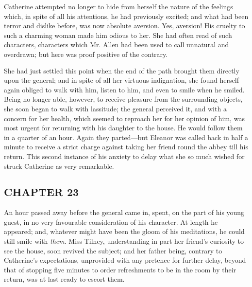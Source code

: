 Catherine attempted no longer to hide from herself the nature of the feelings which, in spite of all his attentions, he had previously excited; and what had been terror and dislike before, was now absolute aversion. Yes, aversion! His cruelty to such a charming woman made him odious to her. She had often read of such characters, characters which Mr. Allen had been used to call unnatural and overdrawn; but here was proof positive of the contrary.

She had just settled this point when the end of the path brought them directly upon the general; and in spite of all her virtuous indignation, she found herself again obliged to walk with him, listen to him, and even to smile when he smiled. Being no longer able, however, to receive pleasure from the surrounding objects, she soon began to walk with lassitude; the general perceived it, and with a concern for her health, which seemed to reproach her for her opinion of him, was most urgent for returning with his daughter to the house. He would follow them in a quarter of an hour. Again they parted---but Eleanor was called back in half a minute to receive a strict charge against taking her friend round the abbey till his return. This second instance of his anxiety to delay what she so much wished for struck Catherine as very remarkable.

\subsection[chapter-23]{\useURL[url25][][][]\from[url25]CHAPTER 23}

An hour passed away before the general came in, spent, on the part of his young guest, in no very favourable consideration of his character.  At length he appeared; and, whatever might have been the gloom of his meditations, he could still smile with {\em them}. Miss Tilney, understanding in part her friend's curiosity to see the house, soon revived the subject; and her father being, contrary to Catherine's expectations, unprovided with any pretence for further delay, beyond that of stopping five minutes to order refreshments to be in the room by their return, was at last ready to escort them.

